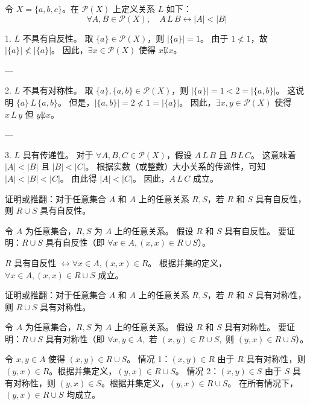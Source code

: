 \begin{questions}
\question 
令 $X = \{a, b, c\}$。在 $\mathcal{P}(X)$ 上定义关系 $L$ 如下：
\[ \forall A, B \in \mathcal{P}(X), \quad A \, L \, B \leftrightarrow |A| < |B| \]

\begin{solution}
1. $L$ 不具有自反性。
取 $\{a\} \in \mathcal{P}(X)$，则 $|\{a\}| = 1$。
由于 $1 \nless 1$，故 $|\{a\}| \nless |\{a\}|$。
因此，$\exists x \in \mathcal{P}(X)$ 使得 $x \not L x$。

---

2. $L$ 不具有对称性。
取 $\{a\}, \{a, b\} \in \mathcal{P}(X)$，则 $|\{a\}| = 1 < 2 = |\{a, b\}|$。
这说明 $\{a\} \, L \, \{a, b\}$。
但是，$|\{a, b\}| = 2 \nless 1 = |\{a\}|$。
因此，$\exists x, y \in \mathcal{P}(X)$ 使得 $x \, L \, y$ 但 $y \not L x$。

---

3. $L$ 具有传递性。
对于 $\forall A, B, C \in \mathcal{P}(X)$，假设 $A \, L \, B$ 且 $B \, L \, C$。
这意味着 $|A| < |B|$ 且 $|B| < |C|$。
根据实数（或整数）大小关系的传递性，可知 $|A| < |B| < |C|$。
由此得 $|A| < |C|$。
因此，$A \, L \, C$ 成立。
\end{solution}

\question 
证明或推翻：对于任意集合 $A$ 和 $A$ 上的任意关系 $R, S$，若 $R$ 和 $S$ 具有自反性，则 $R \cup S$ 具有自反性。

\begin{solution}
令 $A$ 为任意集合，$R, S$ 为 $A$ 上的任意关系。
假设 $R$ 和 $S$ 具有自反性。
要证明：$R \cup S$ 具有自反性（即 $\forall x \in A, (x, x) \in R \cup S$）。

$R$ 具有自反性 $\leftrightarrow \forall x \in A, (x, x) \in R$。
根据并集的定义，$\forall x \in A, (x, x) \in R \cup S$ 成立。
\end{solution}

\question 
证明或推翻：对于任意集合 $A$ 和 $A$ 上的任意关系 $R, S$，若 $R$ 和 $S$ 具有对称性，则 $R \cup S$ 具有对称性。

\begin{solution}
令 $A$ 为任意集合，$R, S$ 为 $A$ 上的任意关系。
假设 $R$ 和 $S$ 具有对称性。
要证明：$R \cup S$ 具有对称性（即 $\forall x, y \in A,$ 若 $(x, y) \in R \cup S,$ 则 $(y, x) \in R \cup S$）。

令 $x, y \in A$ 使得 $(x, y) \in R \cup S$。
情况 1：$(x, y) \in R$
由于 $R$ 具有对称性，则 $(y, x) \in R$。根据并集定义，$(y, x) \in R \cup S$。
情况 2：$(x, y) \in S$
由于 $S$ 具有对称性，则 $(y, x) \in S$。根据并集定义，$(y, x) \in R \cup S$。
在所有情况下，$(y, x) \in R \cup S$ 均成立。
\end{solution}


\end{questions}
